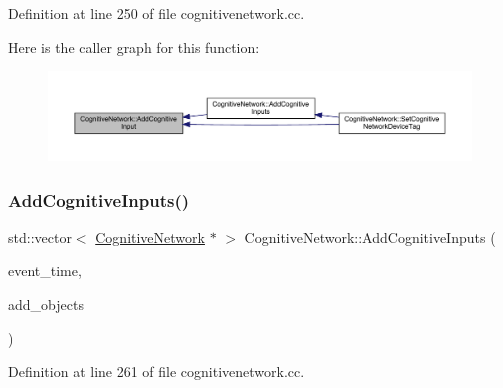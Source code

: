 Definition at line 250 of file cognitivenetwork.\+cc.

Here is the caller graph for this function\+:
\nopagebreak
\begin{figure}[H]
\begin{center}
\leavevmode
\includegraphics[width=350pt]{class_cognitive_network_a6af57693982286ac6a6831ca3010b760_icgraph}
\end{center}
\end{figure}
\mbox{\label{class_cognitive_network_afc92c9b378e7e0873d0164bc4f2635df}} 
\subsubsection{\texorpdfstring{Add\+Cognitive\+Inputs()}{AddCognitiveInputs()}}
{\footnotesize\ttfamily std\+::vector$<$ \hyperlink{class_cognitive_network}{Cognitive\+Network} $\ast$ $>$ Cognitive\+Network\+::\+Add\+Cognitive\+Inputs (\begin{DoxyParamCaption}\item[{std\+::chrono\+::time\+\_\+point$<$ \hyperlink{universe_8h_a0ef8d951d1ca5ab3cfaf7ab4c7a6fd80}{Clock} $>$}]{event\+\_\+time,  }\item[{std\+::vector$<$ \hyperlink{class_cognitive_network}{Cognitive\+Network} $\ast$$>$}]{add\+\_\+objects }\end{DoxyParamCaption})}



Definition at line 261 of file cognitivenetwork.\+cc.

